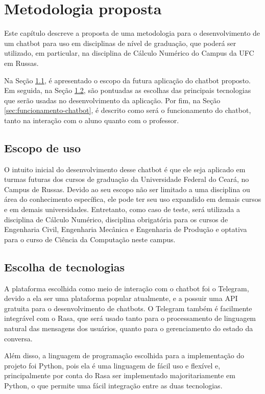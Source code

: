 \chapter{Metodologia proposta}
\label{cap:metodologia}

Este capítulo descreve a proposta de uma metodologia para o desenvolvimento de um chatbot para uso em disciplinas de nível de graduação, que poderá ser utilizado, em particular, na disciplina de Cálculo Numérico do Campus da UFC em Russas.

Na Seção \ref{sec:escopo}, é apresentado o escopo da futura aplicação do chatbot proposto. Em seguida, na Seção \ref{sec:escolha-tecnologias}, são pontuadas as escolhas das principais tecnologias que serão usadas no desenvolvimento da aplicação. Por fim, na Seção \ref{sec:funcionamento-chatbot}, é descrito como será o funcionamento do chatbot, tanto na interação com o aluno quanto com o professor.

\section{Escopo de uso}
\label{sec:escopo}

O intuito inicial do desenvolvimento desse chatbot é que ele seja aplicado em turmas futuras dos cursos de graduação da Universidade Federal do Ceará, no Campus de Russas. Devido ao seu escopo não ser limitado a uma disciplina ou área do conhecimento específica, ele pode ter seu uso expandido em demais cursos e em demais universidades. Entretanto, como caso de teste, será utilizada a disciplina de Cálculo Numérico, disciplina obrigatória para os cursos de Engenharia Civil, Engenharia Mecânica e Engenharia de Produção e optativa para o curso de Ciência da Computação neste campus.

\section{Escolha de tecnologias}
\label{sec:escolha-tecnologias}

A plataforma escolhida como meio de interação com o chatbot foi o Telegram, devido a ela ser uma plataforma popular atualmente, e a possuir uma API gratuita para o desenvolvimento de chatbots. O Telegram também é facilmente integrável com o Rasa, que será usado tanto para o processamento de linguagem natural das mensagens dos usuários, quanto para o gerenciamento do estado da conversa.

Além disso, a linguagem de programação escolhida para a implementação do projeto foi Python, pois ela é uma linguagem de fácil uso e flexível e, principalmente por conta do Rasa ser implementado majoritariamente em Python, o que permite uma fácil integração entre as duas tecnologias.

